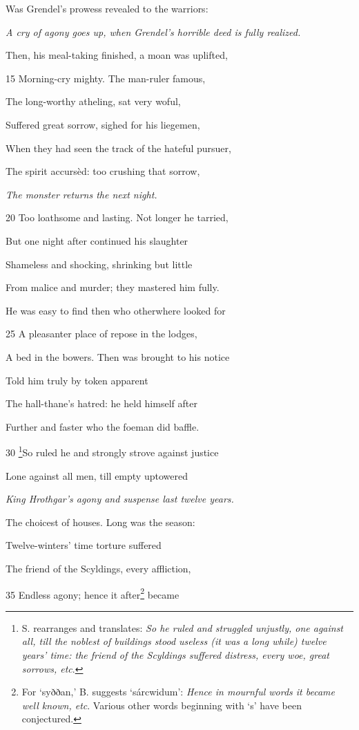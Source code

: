 Was Grendel’s prowess revealed to the warriors:

\emph{A cry of agony
goes up, when
Grendel’s horrible
deed is fully realized.}

Then, his meal-taking finished, a moan was uplifted,

15
Morning-cry mighty. The man-ruler famous,

The long-worthy atheling, sat very woful,

Suffered great sorrow, sighed for his liegemen,

When they had seen the track of the hateful pursuer,

The spirit accursèd: too crushing that sorrow,

\emph{The monster returns
the next
night.}

20
Too loathsome and lasting. Not longer he tarried,

But one night after continued his slaughter

Shameless and shocking, shrinking but little

From malice and murder; they mastered him fully.

He was easy to find then who otherwhere looked for

25
A pleasanter place of repose in the lodges,

A bed in the bowers. Then was brought to his notice

Told him truly by token apparent

The hall-thane’s hatred: he held himself after

Further and faster who the foeman did baffle.

30
\footnote{S. rearranges and translates: \emph{So he ruled and struggled unjustly, one against
all, till the noblest of buildings stood useless (it was a long while) twelve years’
time: the friend of the Scyldings suffered distress, every woe, great sorrows, etc}.}So ruled he and strongly strove against justice

Lone against all men, till empty uptowered

\emph{King Hrothgar’s
agony and suspense
last twelve
years.}

The choicest of houses. Long was the season:

Twelve-winters’ time torture suffered

The friend of the Scyldings, every affliction,

35
Endless agony; hence it after\footnote{For ‘syððan,’ B. suggests ‘sárcwidum’: \emph{Hence in mournful words it became
well known, etc}. Various other words beginning with ‘s’ have been
conjectured.} became

